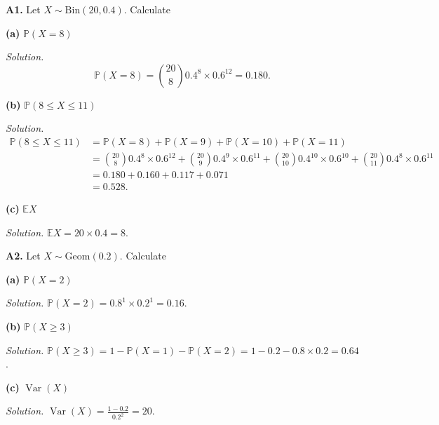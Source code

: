 \documentclass[
  a4paper,
]{book}
\theoremstyle{definition}
\theoremstyle{definition}
\theoremstyle{definition}
\theoremstyle{definition}
\theoremstyle{remark}
\begin{document}
\textbf{A1.} Let \(X \sim \text{Bin}(20, 0.4)\). Calculate

\textbf{(a)} \(\mathbb P(X = 8)\)

\begin{myanswers}
\emph{Solution.}
\[ \mathbb P(X = 8) = \binom{20}{8} 0.4^8 \times 0.6^{12} = 0.180 . \]

\end{myanswers}

\textbf{(b)} \(\mathbb P(8 \leq X \leq 11)\)

\begin{myanswers}
\emph{Solution.}
\begin{align*}
\mathbb P(8 \leq X \leq 11) &= \mathbb P(X = 8) + \mathbb P(X = 9) + \mathbb P(X = 10) + \mathbb P(X = 11) \\ 
&= \binom{20}{8} 0.4^8 \times 0.6^{12} + \binom{20}{9} 0.4^9 \times 0.6^{11} + \binom{20}{10} 0.4^10 \times 0.6^{10} + \binom{20}{11} 0.4^8 \times 0.6^{11} \\
&= 0.180 + 0.160 + 0.117 + 0.071 \\
&= 0.528 .
\end{align*}

\end{myanswers}

\textbf{(c)} \(\mathbb EX\)

\begin{myanswers}
\emph{Solution.} \(\mathbb EX = 20 \times 0.4 = 8\).

\end{myanswers}

\textbf{A2.} Let \(X \sim \text{Geom}(0.2)\). Calculate

\textbf{(a)} \(\mathbb P(X = 2)\)

\begin{myanswers}
\emph{Solution.} \(\mathbb P(X = 2) = 0.8^1 \times 0.2^1 = 0.16\).

\end{myanswers}

\textbf{(b)} \(\mathbb P(X \geq 3)\)

\begin{myanswers}
\emph{Solution.} \(\mathbb P(X \geq 3) = 1 - \mathbb P(X =1) - \mathbb P(X = 2) = 1 - 0.2 - 0.8\times 0.2 = 0.64\).

\end{myanswers}

\textbf{(c)} \(\operatorname{Var}(X)\)

\begin{myanswers}
\emph{Solution.} \({\displaystyle \operatorname{Var}(X) = \frac{1 - 0.2}{0.2^2} = 20}\).

\end{myanswers}
\end{document}
